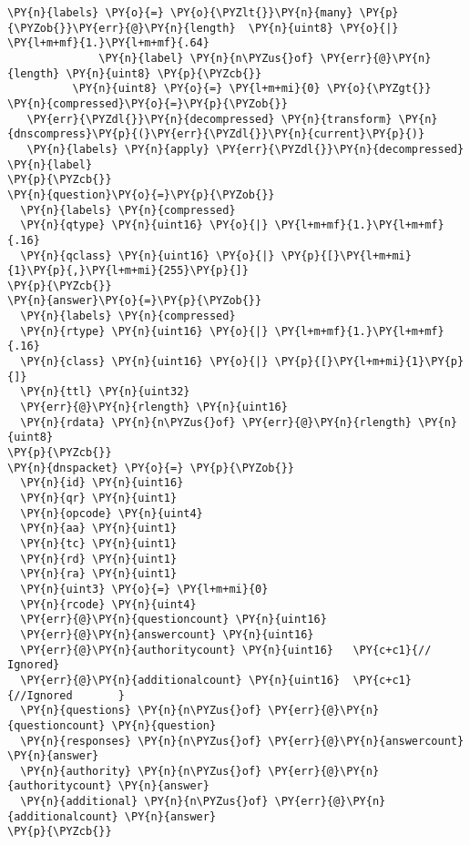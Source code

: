 \begin{Verbatim}[commandchars=\\\{\},codes={\catcode`\$=3\catcode`\^=7\catcode`\_=8}]
\PY{n}{labels} \PY{o}{=} \PY{o}{\PYZlt{}}\PY{n}{many} \PY{p}{\PYZob{}}\PY{err}{@}\PY{n}{length}  \PY{n}{uint8} \PY{o}{|} \PY{l+m+mf}{1.}\PY{l+m+mf}{.64}
              \PY{n}{label} \PY{n}{n\PYZus{}of} \PY{err}{@}\PY{n}{length} \PY{n}{uint8} \PY{p}{\PYZcb{}}
          \PY{n}{uint8} \PY{o}{=} \PY{l+m+mi}{0} \PY{o}{\PYZgt{}} 
\PY{n}{compressed}\PY{o}{=}\PY{p}{\PYZob{}}
   \PY{err}{\PYZdl{}}\PY{n}{decompressed} \PY{n}{transform} \PY{n}{dnscompress}\PY{p}{(}\PY{err}{\PYZdl{}}\PY{n}{current}\PY{p}{)}
   \PY{n}{labels} \PY{n}{apply} \PY{err}{\PYZdl{}}\PY{n}{decompressed} \PY{n}{label}
\PY{p}{\PYZcb{}}     
\PY{n}{question}\PY{o}{=}\PY{p}{\PYZob{}}
  \PY{n}{labels} \PY{n}{compressed}
  \PY{n}{qtype} \PY{n}{uint16} \PY{o}{|} \PY{l+m+mf}{1.}\PY{l+m+mf}{.16} 
  \PY{n}{qclass} \PY{n}{uint16} \PY{o}{|} \PY{p}{[}\PY{l+m+mi}{1}\PY{p}{,}\PY{l+m+mi}{255}\PY{p}{]}
\PY{p}{\PYZcb{}}
\PY{n}{answer}\PY{o}{=}\PY{p}{\PYZob{}}
  \PY{n}{labels} \PY{n}{compressed}
  \PY{n}{rtype} \PY{n}{uint16} \PY{o}{|} \PY{l+m+mf}{1.}\PY{l+m+mf}{.16}
  \PY{n}{class} \PY{n}{uint16} \PY{o}{|} \PY{p}{[}\PY{l+m+mi}{1}\PY{p}{]}
  \PY{n}{ttl} \PY{n}{uint32}
  \PY{err}{@}\PY{n}{rlength} \PY{n}{uint16} 
  \PY{n}{rdata} \PY{n}{n\PYZus{}of} \PY{err}{@}\PY{n}{rlength} \PY{n}{uint8} 
\PY{p}{\PYZcb{}}
\PY{n}{dnspacket} \PY{o}{=} \PY{p}{\PYZob{}}
  \PY{n}{id} \PY{n}{uint16}
  \PY{n}{qr} \PY{n}{uint1}
  \PY{n}{opcode} \PY{n}{uint4}
  \PY{n}{aa} \PY{n}{uint1} 
  \PY{n}{tc} \PY{n}{uint1}
  \PY{n}{rd} \PY{n}{uint1}
  \PY{n}{ra} \PY{n}{uint1}
  \PY{n}{uint3} \PY{o}{=} \PY{l+m+mi}{0}
  \PY{n}{rcode} \PY{n}{uint4}
  \PY{err}{@}\PY{n}{questioncount} \PY{n}{uint16}
  \PY{err}{@}\PY{n}{answercount} \PY{n}{uint16}
  \PY{err}{@}\PY{n}{authoritycount} \PY{n}{uint16}   \PY{c+c1}{// Ignored}
  \PY{err}{@}\PY{n}{additionalcount} \PY{n}{uint16}  \PY{c+c1}{//Ignored       }
  \PY{n}{questions} \PY{n}{n\PYZus{}of} \PY{err}{@}\PY{n}{questioncount} \PY{n}{question}         
  \PY{n}{responses} \PY{n}{n\PYZus{}of} \PY{err}{@}\PY{n}{answercount} \PY{n}{answer}
  \PY{n}{authority} \PY{n}{n\PYZus{}of} \PY{err}{@}\PY{n}{authoritycount} \PY{n}{answer}
  \PY{n}{additional} \PY{n}{n\PYZus{}of} \PY{err}{@}\PY{n}{additionalcount} \PY{n}{answer}
\PY{p}{\PYZcb{}}
\end{Verbatim}
